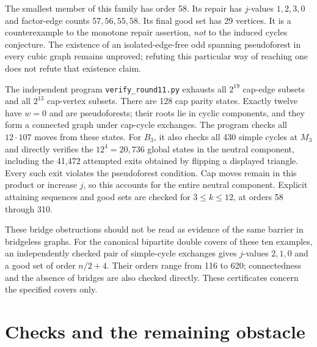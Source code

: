 \documentclass[11pt]{article}
\begin{document}
The smallest member of this family has order 58. Its repair has
$j$-values $1,2,3,0$ and factor-edge counts $57,56,55,58$.
Its final good set has 29 vertices. It is a counterexample to the
monotone repair assertion, \emph{not} to the induced cycles
conjecture. The existence of an isolated-edge-free odd spanning
pseudoforest in every cubic graph remains unproved; refuting this
particular way of reaching one does not refute that existence claim.

The independent program \texttt{verify\_round11.py} exhausts all
$2^{19}$ cap-edge subsets and all $2^{13}$ cap-vertex subsets.
There are 128 cap parity states. Exactly twelve have $w=0$ and
are pseudoforests; their roots lie in cyclic components, and they
form a connected graph under cap-cycle exchanges. The program
checks all $12\cdot107$ moves from these states. For $B_3$, it
also checks all 430 simple cycles at $M_3$ and directly verifies
the $12^4=20,736$ global states in the neutral component, including
the 41,472 attempted exits obtained by flipping a displayed triangle.
Every such exit violates the pseudoforest condition. Cap moves
remain in this product or increase $j$, so this accounts for the
entire neutral component. Explicit attaining sequences and good
sets are checked for $3\leq k\leq12$, at orders 58 through 310.

These bridge obstructions should not be read as evidence of the
same barrier in bridgeless graphs. For the canonical bipartite
double covers of these ten examples, an independently checked
pair of simple-cycle exchanges gives $j$-values $2,1,0$ and
a good set of order $n/2+4$. Their orders range from 116 to 620;
connectedness and the absence of bridges are also checked directly.
These certificates concern the specified covers only.

\section{Checks and the remaining obstacle}
\end{document}
